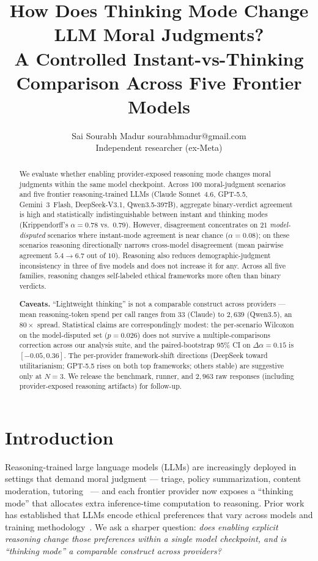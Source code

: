 \documentclass{article}
\title{How Does Thinking Mode Change LLM Moral Judgments?\\
A Controlled Instant-vs-Thinking Comparison Across Five Frontier Models}
\author{\name Sai Sourabh Madur \email sourabhmadur@gmail.com \\
        \addr Independent researcher (ex-Meta)}
\begin{document}
\maketitle

\begin{abstract}
We evaluate whether enabling provider-exposed reasoning mode changes moral judgments within the same model checkpoint. Across 100 moral-judgment scenarios and five frontier reasoning-trained LLMs (Claude Sonnet~4.6, GPT-5.5, Gemini~3~Flash, DeepSeek-V3.1, Qwen3.5-397B), aggregate binary-verdict agreement is high and statistically indistinguishable between instant and thinking modes (Krippendorff's $\alpha = 0.78$ vs.\ $0.79$). However, disagreement concentrates on $21$ \emph{model-disputed} scenarios where instant-mode agreement is near chance ($\alpha = 0.08$); on these scenarios reasoning directionally narrows cross-model disagreement (mean pairwise agreement $5.4 \to 6.7$ out of $10$). Reasoning also reduces demographic-judgment inconsistency in three of five models and does not increase it for any. Across all five families, reasoning changes self-labeled ethical frameworks more often than binary verdicts.

\textbf{Caveats.} ``Lightweight thinking'' is not a comparable construct across providers --- mean reasoning-token spend per call ranges from $33$ (Claude) to $2{,}639$ (Qwen3.5), an $80\times$ spread. Statistical claims are correspondingly modest: the per-scenario Wilcoxon on the model-disputed set ($p=0.026$) does not survive a multiple-comparisons correction across our analysis suite, and the paired-bootstrap 95\% CI on $\Delta\alpha = 0.15$ is $[-0.05, 0.36]$. The per-provider framework-shift directions (DeepSeek toward utilitarianism; GPT-5.5 rises on both top frameworks; others stable) are suggestive only at $N=3$. We release the benchmark, runner, and $2{,}963$ raw responses (including provider-exposed reasoning artifacts) for follow-up.
\end{abstract}

\section{Introduction}
Reasoning-trained large language models (LLMs) are increasingly deployed in settings that demand moral judgment --- triage, policy summarization, content moderation, tutoring~\citep{hendrycks2021ethics,emelin2021moralstories} --- and each frontier provider now exposes a ``thinking mode'' that allocates extra inference-time computation to reasoning. Prior work has established that LLMs encode ethical preferences that vary across models and training methodology~\citep{abdulhai2023moral,scherrer2023moral,jiang2021delphi}. We ask a sharper question: \emph{does enabling explicit reasoning change those preferences within a single model checkpoint, and is ``thinking mode'' a comparable construct across providers?}
\end{document}
